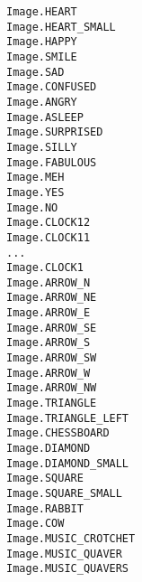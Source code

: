 \setlength{\columnsep}{4pt}
\begin{multicols}{4}
	\texttt{Image.HEART}\\
	\texttt{Image.HEART\_SMALL}\\
	\texttt{Image.HAPPY}\\
	\texttt{Image.SMILE}\\
	\texttt{Image.SAD}\\
	\texttt{Image.CONFUSED}\\
	\texttt{Image.ANGRY}\\
	\texttt{Image.ASLEEP}\\
	\texttt{Image.SURPRISED}\\
	\texttt{Image.SILLY}\\
	\texttt{Image.FABULOUS}\\
	\texttt{Image.MEH}\\
	\texttt{Image.YES}\\
	\texttt{Image.NO}\\
	\texttt{Image.CLOCK12}\\
	\texttt{Image.CLOCK11}\\
	\texttt{...}\\
	\texttt{Image.CLOCK1}\\
	\texttt{Image.ARROW\_N}\\
	\texttt{Image.ARROW\_NE}\\
	\texttt{Image.ARROW\_E}\\
	\texttt{Image.ARROW\_SE}\\
	\texttt{Image.ARROW\_S}\\
	\texttt{Image.ARROW\_SW}\\
	\texttt{Image.ARROW\_W}\\
	\texttt{Image.ARROW\_NW}\\
	\texttt{Image.TRIANGLE}\\
	\texttt{Image.TRIANGLE\_LEFT}\\
	\texttt{Image.CHESSBOARD}\\
	\texttt{Image.DIAMOND}\\
	\texttt{Image.DIAMOND\_SMALL}\\
	\texttt{Image.SQUARE}\\
	\texttt{Image.SQUARE\_SMALL}\\
	\texttt{Image.RABBIT}\\
	\texttt{Image.COW}\\
	\texttt{Image.MUSIC\_CROTCHET}\\
	\texttt{Image.MUSIC\_QUAVER}\\
	\texttt{Image.MUSIC\_QUAVERS}\\

\end{multicols}
